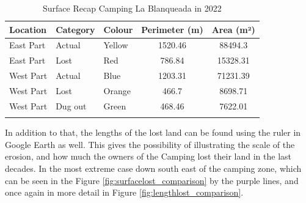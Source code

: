 \begin{table}[H]
\centering
\caption{Surface Recap Camping La Blanqueada in 2022}
\label{tab:Surface Lost Camping La Blanqueada in 2022}
\begin{tabular}{l l l S[table-format=5.2] S[table-format=5.2]}
\toprule
Location & Category & Colour & Perimeter (m) & Area (m²) \\
\midrule
East Part & Actual & Yellow & 1520.46 & 88494.3 \\
East Part & Lost & Red & 786.84 & 15328.31 \\
West Part & Actual & Blue & 1203.31 & 71231.39 \\
West Part & Lost & Orange & 466.7 & 8698.71 \\
West Part & Dug out & Green & 468.46 & 7622.01\\
\bottomrule
\label{Table: Surface Recap Camping La Blanqueada in 2022}
\end{tabular}
\end{table}

In addition to that, the lengths of the lost land can be found using the ruler in Google Earth as well. This gives the possibility of illustrating the scale of the erosion, and how much the owners of the Camping lost their land in the last decades. 
In the most extreme case down south east of the camping zone, which can be seen in the Figure \ref{fig:surfacelost_comparison} by the purple lines, and once again in more detail in Figure \ref{fig:lengthlost_comparison}.


